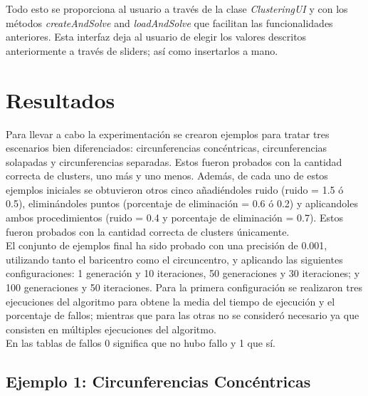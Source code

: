 \documentclass[conference,a4paper]{IEEEtran}
\begin{document}
Todo esto se proporciona al usuario a través de la clase \textit{ClusteringUI} y con los métodos \textit{createAndSolve} and \textit{loadAndSolve} que facilitan las funcionalidades anteriores. Esta interfaz deja al usuario de elegir los valores descritos anteriormente a través de sliders; así como insertarlos a mano.\\

\section{Resultados}

Para llevar a cabo la experimentación se crearon ejemplos para tratar tres escenarios bien diferenciados: circunferencias concéntricas, circunferencias solapadas y circunferencias separadas. Estos fueron probados con la cantidad correcta de clusters, uno más y uno menos. Además, de cada uno de estos ejemplos iniciales se obtuvieron otros cinco añadiéndoles ruido (ruido = 1.5 ó 0.5), eliminándoles puntos (porcentaje de eliminación = 0.6 ó 0.2) y aplicandoles ambos procedimientos (ruido = 0.4 y porcentaje de eliminación = 0.7). Estos fueron probados con la cantidad correcta de clusters únicamente.\\

El conjunto de ejemplos final ha sido probado con una precisión de 0.001, utilizando tanto el baricentro como el circuncentro, y aplicando las siguientes configuraciones: 1 generación y 10 iteraciones, 50 generaciones y 30 iteraciones; y 100 generaciones y 50 iteraciones. Para la primera configuración se realizaron tres ejecuciones del algoritmo para obtene la media del tiempo de ejecución y el porcentaje de fallos; mientras que para las otras no se consideró necesario ya que consisten en múltiples ejecuciones del algoritmo.\\

En las tablas de fallos 0 significa que no hubo fallo y 1 que sí.\\

\newpage
\subsection{Ejemplo 1: Circunferencias Concéntricas}
\end{document}
